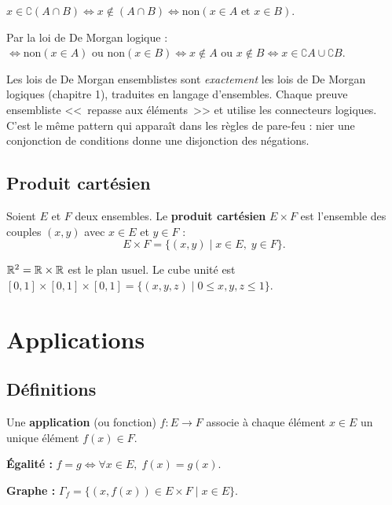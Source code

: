 \begin{proofbox}[Preuve de De Morgan $\complement(A \cap B) = \complement A \cup \complement B$]
$x \in \complement(A \cap B) \iff x \notin (A \cap B) \iff \text{non}(x \in A \text{ et } x \in B)$.

Par la loi de De Morgan logique : $\iff \text{non}(x \in A) \text{ ou } \text{non}(x \in B) \iff x \notin A \text{ ou } x \notin B \iff x \in \complement A \cup \complement B$.
\end{proofbox}

\begin{intuitionbox}
Les lois de De Morgan ensemblistes sont \emph{exactement} les lois de De Morgan logiques (chapitre 1), traduites en langage d'ensembles. Chaque preuve ensembliste <<~repasse aux éléments~>> et utilise les connecteurs logiques. C'est le même pattern qui apparaît dans les règles de pare-feu : nier une conjonction de conditions donne une disjonction des négations.
\end{intuitionbox}


\subsection{Produit cartésien}

\begin{defbox}
Soient $E$ et $F$ deux ensembles. Le \textbf{produit cartésien} $E \times F$ est l'ensemble des couples $(x, y)$ avec $x \in E$ et $y \in F$ :
\[E \times F = \{(x, y) \mid x \in E,\; y \in F\}.\]
\end{defbox}

\begin{exbox}
$\mathbb{R}^2 = \mathbb{R} \times \mathbb{R}$ est le plan usuel. Le cube unité est $[0,1] \times [0,1] \times [0,1] = \{(x,y,z) \mid 0 \leqslant x,y,z \leqslant 1\}$.
\end{exbox}


\section{Applications}

\subsection{Définitions}

\begin{defbox}[--- Application]
Une \textbf{application} (ou fonction) $f : E \to F$ associe à chaque élément $x \in E$ un unique élément $f(x) \in F$.

\medskip
\textbf{Égalité :} $f = g \iff \forall x \in E,\; f(x) = g(x)$.

\medskip
\textbf{Graphe :} $\Gamma_f = \{(x, f(x)) \in E \times F \mid x \in E\}$.
\end{defbox}

